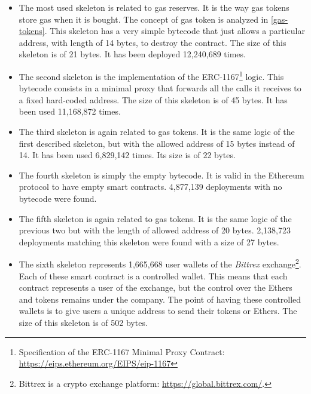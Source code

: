 \begin{itemize}

    \item The most used skeleton is related to gas reserves. It is the way gas tokens store gas when it is bought. The concept of gas token is analyzed in \cref{gas-tokens}. This skeleton has a very simple bytecode that just allows a particular address, with length of 14 bytes, to destroy the contract. The size of this skeleton is of 21 bytes. It has been deployed 12,240,689 times.
    
    \item The second skeleton is the implementation of the ERC-1167\footnote{Specification of the ERC-1167 Minimal Proxy Contract: \url{https://eips.ethereum.org/EIPS/eip-1167}} logic. This bytecode consists in a minimal proxy that forwards all the calls it receives to a fixed hard-coded address. The size of this skeleton is of 45 bytes. It has been used 11,168,872 times.

    \item The third skeleton is again related to gas tokens. It is the same logic of the first described skeleton, but with the allowed address of 15 bytes instead of 14. It has been used 6,829,142 times. Its size is of 22 bytes.

    \item The fourth skeleton is simply the empty bytecode. It is valid in the Ethereum protocol to have empty smart contracts. 4,877,139 deployments with no bytecode were found.

    \item The fifth skeleton is again related to gas tokens. It is the same logic of the previous two but with the length of allowed address of 20 bytes. 2,138,723 deployments matching this skeleton were found with a size of 27 bytes.

    \item The sixth skeleton represents 1,665,668 user wallets of the \textit{Bittrex} exchange\footnote{Bittrex is a crypto exchange platform: \url{https://global.bittrex.com/}.}. Each of these smart contract is a controlled wallet. This means that each contract represents a user of the exchange, but the control over the Ethers and tokens remains under the company. The point of having these controlled wallets is to give users a unique address to send their tokens or Ethers. The size of this skeleton is of 502 bytes.


\end{itemize}

